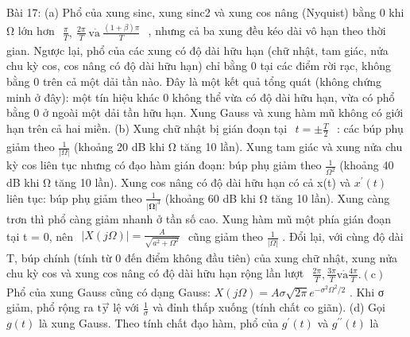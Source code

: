 \documentclass[
  10
]{article}
\begin{document}
Bài 17: (a) Phổ của xung sinc, xung sinc2 và xung cos nâng (Nyquist)
bằng 0 khi Ω lớn hơn
\({ \begin{array} { l } { { \frac { \pi } { T } } , \ { \frac { 2 \pi } { T } } \ { \mathrm { v { \dot { a } } } } \ { \frac { ( 1 + \beta ) \pi } { T } } } \end{array} }\)
, nhưng cả ba xung đều kéo dài vô hạn theo thời gian. Ngược lại, phổ của
các xung có độ dài hữu hạn (chữ nhật, tam giác, nửa chu kỳ cos, cos nâng
có độ dài hữu hạn) chỉ bằng 0 tại các điểm rời rạc, không bằng 0 trên cả
một dải tần nào. Đây là một kết quả tổng quát (không chứng minh ở đây):
một tín hiệu khác 0 không thể vừa có độ dài hữu hạn, vừa có phổ bằng 0 ở
ngoài một dải tần hữu hạn. Xung Gauss và xung hàm mũ không có giới hạn
trên cả hai miền. (b) Xung chữ nhật bị gián đoạn tại
\(\begin{array} { r } { t = \pm \frac { T } { 2 } } \end{array}\) : các
búp phụ giảm theo \(\frac { 1 } { | \Omega | }\) (khoảng 20 dB khi Ω
tăng 10 lần). Xung tam giác và xung nửa chu kỳ cos liên tục nhưng có đạo
hàm gián đoạn: búp phụ giảm theo
\(\textstyle { \frac { 1 } { \Omega ^ { 2 } } }\) (khoảng 40 dB khi Ω
tăng 10 lần). Xung cos nâng có độ dài hữu hạn có cả x(t) và
\(x ^ { \prime } ( t )\) liên tục: búp phụ giảm theo
\(\scriptstyle { \frac { 1 } { | { \boldsymbol { \Omega } } | ^ { 3 } } }\)
(khoảng 60 dB khi Ω tăng 10 lần). Xung càng trơn thì phổ càng giảm nhanh
ở tần số cao. Xung hàm mũ một phía gián đoạn tại t = 0, nên
\(\begin{array} { r } { | X ( j \Omega ) | = \frac { A } { \sqrt { a ^ { 2 } + \Omega ^ { 2 } } } } \end{array}\)
cũng giảm theo \(\scriptstyle { \frac { 1 } { | \Omega | } }\) . Đổi
lại, với cùng độ dài T, búp chính (tính từ 0 đến điểm không đầu tiên)
của xung chữ nhật, xung nửa chu kỳ cos và xung cos nâng có độ dài hữu
hạn rộng lần lượt
\(\begin{array} { r } { \frac { 2 \pi } { T } , \frac { 3 \pi } { T } \mathrm { v } \mathrm { \dot { a } } \frac { 4 \pi } { T } . \mathrm { ( c ) } } \end{array}\)
Phổ của xung Gauss cũng có dạng Gauss:
\(X ( j \Omega ) = A \sigma \sqrt { 2 \pi } e ^ { - \sigma ^ { 2 } \Omega ^ { 2 } / 2 }\)
. Khi σ giảm, phổ rộng ra \(\mathrm { t \vec { y } }\) lệ với
\(\textstyle { \frac { 1 } { \sigma } }\) và đỉnh thấp xuống (tính chất
co giãn). (d) Gọi \(g ( t )\) là xung Gauss. Theo tính chất đạo hàm, phổ
của \(g ^ { \prime } ( t )\) và \(g ^ { \prime \prime } ( t )\) là
\end{document}
